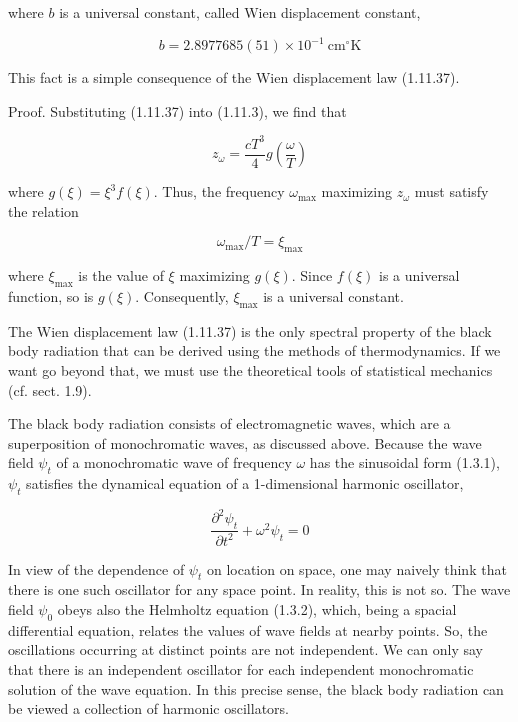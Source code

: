 \documentclass{article}
\begin{document}
where $b$ is a universal constant, called Wien displacement constant,
 
\begin{equation*}
b=2.8977685(51) \times 10^{-1} \mathrm{~cm}^{\circ} \mathrm{K} \tag{1.11.56}
\end{equation*}
 

This fact is a simple consequence of the Wien displacement law (1.11.37).

Proof. Substituting (1.11.37) into (1.11.3), we find that
 
\begin{equation*}
z_{\omega}=\frac{c T^{3}}{4} g\left(\frac{\omega}{T}\right) \tag{1.11.57}
\end{equation*}
 
where $g(\xi)=\xi^{3} f(\xi)$. Thus, the frequency $\omega_{\max }$ maximizing $z_{\omega}$ must satisfy the relation
 
\begin{equation*}
\omega_{\max } / T=\xi_{\max } \tag{1.11.58}
\end{equation*}
 
where $\xi_{\max }$ is the value of $\xi$ maximizing $g(\xi)$. Since $f(\xi)$ is a universal function, so is $g(\xi)$. Consequently, $\xi_{\max }$ is a universal constant.

The Wien displacement law (1.11.37) is the only spectral property of the black body radiation that can be derived using the methods of thermodynamics. If we want go beyond that, we must use the theoretical tools of statistical mechanics (cf. sect. 1.9).

The black body radiation consists of electromagnetic waves, which are a superposition of monochromatic waves, as discussed above. Because the wave field $\psi_{t}$ of a monochromatic wave of frequency $\omega$ has the sinusoidal form (1.3.1), $\psi_{t}$ satisfies the dynamical equation of a 1-dimensional harmonic oscillator,
 
\begin{equation*}
\frac{\partial^{2} \psi_{t}}{\partial t^{2}}+\omega^{2} \psi_{t}=0 \tag{1.11.59}
\end{equation*}
 

In view of the dependence of $\psi_{t}$ on location on space, one may naively think that there is one such oscillator for any space point. In reality, this is not so. The wave field $\psi_{0}$ obeys also the Helmholtz equation (1.3.2), which, being a spacial differential equation, relates the values of wave fields at nearby points. So, the oscillations occurring at distinct points are not independent. We can only say that there is an independent oscillator for each independent monochromatic solution of the wave equation. In this precise sense, the black body radiation can be viewed a collection of harmonic oscillators.
\end{document}
